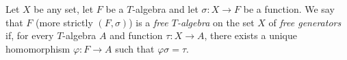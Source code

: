 Let $X$ be any set, let $F$ be a $T$-algebra and let $\sigma: X \to F$ be a function. We say that $F$ (more strictly $(F, \sigma)$) is a \emph{free $T$-algebra} on the set $X$ of \emph{free generators} if, for every $T$-algebra $A$ and function $\tau: X \to A$, there exists a unique homomorphism $\varphi: F \to A$ such that $\varphi\sigma = \tau$.
